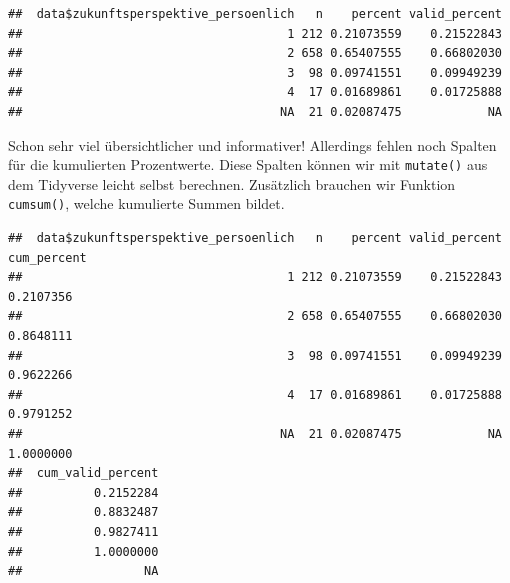 \documentclass[
]{book}
\newenvironment{Shaded}{\begin{snugshade}}{\end{snugshade}}
\newcommand{\AttributeTok}[1]{\textcolor[rgb]{0.77,0.63,0.00}{#1}}
\newcommand{\CommentTok}[1]{\textcolor[rgb]{0.56,0.35,0.01}{\textit{#1}}}
\newcommand{\FunctionTok}[1]{\textcolor[rgb]{0.00,0.00,0.00}{#1}}
\newcommand{\NormalTok}[1]{#1}
\newcommand{\SpecialCharTok}[1]{\textcolor[rgb]{0.00,0.00,0.00}{#1}}
\begin{document}
\begin{Shaded}
\end{Shaded}

\begin{verbatim}
##  data$zukunftsperspektive_persoenlich   n    percent valid_percent
##                                     1 212 0.21073559    0.21522843
##                                     2 658 0.65407555    0.66802030
##                                     3  98 0.09741551    0.09949239
##                                     4  17 0.01689861    0.01725888
##                                    NA  21 0.02087475            NA
\end{verbatim}

Schon sehr viel übersichtlicher und informativer! Allerdings fehlen noch Spalten für die kumulierten Prozentwerte. Diese Spalten können wir mit \texttt{mutate()} aus dem Tidyverse leicht selbst berechnen. Zusätzlich brauchen wir Funktion \texttt{cumsum()}, welche kumulierte Summen bildet.

\begin{Shaded}
\end{Shaded}

\begin{verbatim}
##  data$zukunftsperspektive_persoenlich   n    percent valid_percent cum_percent
##                                     1 212 0.21073559    0.21522843   0.2107356
##                                     2 658 0.65407555    0.66802030   0.8648111
##                                     3  98 0.09741551    0.09949239   0.9622266
##                                     4  17 0.01689861    0.01725888   0.9791252
##                                    NA  21 0.02087475            NA   1.0000000
##  cum_valid_percent
##          0.2152284
##          0.8832487
##          0.9827411
##          1.0000000
##                 NA
\end{verbatim}
\end{document}
